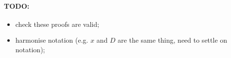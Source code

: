 \documentclass[a4paper, notitlepage, 11pt]{article}
\begin{document}
\paragraph{TODO:}
\begin{itemize}
 \item check these proofs are valid;
 \item harmonise notation (e.g. $x$ and $D$ are the same thing, need to settle on notation);
\end{itemize}



\end{document}
